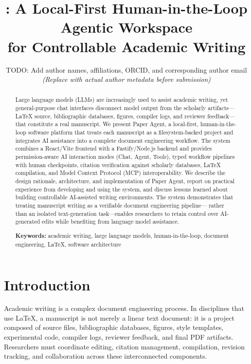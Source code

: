 \documentclass[11pt,a4paper]{article}
\title{\software{}: A Local-First Human-in-the-Loop Agentic Workspace\\for Controllable Academic Writing}
\author{
  TODO: Add author names, affiliations, ORCID, and corresponding author email\\
  \small\textit{(Replace with actual author metadata before submission)}
}
\date{}
\newcommand{\software}{Paper Agent}
\begin{document}
\maketitle

\begin{abstract}
Large language models (LLMs) are increasingly used to assist academic writing,
yet general-purpose chat interfaces disconnect model output from the scholarly
artifacts---LaTeX source, bibliographic databases, figures, compiler logs, and
reviewer feedback---that constitute a real manuscript. We present \software{},
a local-first, human-in-the-loop software platform that treats each manuscript
as a filesystem-backed project and integrates AI assistance into a complete
document engineering workflow. The system combines a React/Vite frontend with a
Fastify/Node.js backend and provides permission-aware AI interaction modes
(Chat, Agent, Tools), typed workflow pipelines with human checkpoints, citation
verification against scholarly databases, LaTeX compilation, and Model Context
Protocol (MCP) interoperability. We describe the design rationale, architecture,
and implementation of \software{}, report on practical experience from
developing and using the system, and discuss lessons learned about building
controllable AI-assisted writing environments. The system demonstrates that
treating manuscript writing as a verifiable document engineering pipeline---
rather than an isolated text-generation task---enables researchers to retain
control over AI-generated edits while benefiting from language model assistance.

\vspace{4pt}
\noindent\textbf{Keywords:} academic writing, large language models,
human-in-the-loop, document engineering, LaTeX, software architecture
\end{abstract}

\section{Introduction}

Academic writing is a complex document engineering process. In disciplines that
use \LaTeX, a manuscript is not merely a linear text document: it is a project
composed of source files, bibliographic databases, figures, style templates,
experimental code, compiler logs, reviewer feedback, and final PDF artifacts.
Researchers must coordinate editing, citation management, compilation, revision
tracking, and collaboration across these interconnected components.
\end{document}
